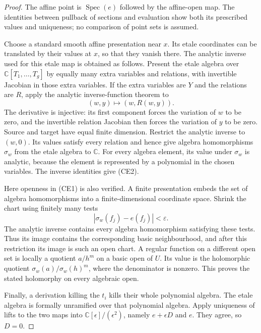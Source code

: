 \begin{proof}
The affine point is \(\operatorname{Spec}(e)\) followed by the affine-open
map.  The identities between pullback of sections and evaluation show both
its prescribed values and uniqueness; no comparison of point sets is
assumed.

Choose a standard smooth affine presentation near \(x\).  Its etale
coordinates can be translated by their values at \(x\), so that they
vanish there.  The analytic inverse used for this etale map is obtained
as follows.  Present the etale algebra over
\(\mathbb C[T_1,\ldots,T_g]\) by equally many extra variables and
relations, with invertible Jacobian in those extra variables.  If the
extra variables are \(Y\) and the relations are \(R\), apply the analytic
inverse-function theorem to
\[
             (w,y)\longmapsto (w,R(w,y)).
\]
The derivative is injective: its first component forces the variation
of \(w\) to be zero, and the invertible relation Jacobian then forces the
variation of \(y\) to be zero.  Source and target have equal finite
dimension.  Restrict the analytic inverse to \((w,0)\).
Its values satisfy every relation and hence give algebra homomorphisms
\(\sigma_w\) from the etale algebra to \(\mathbb C\).
For every algebra element, its value under \(\sigma_w\) is analytic,
because the element is represented by a polynomial in the chosen
variables.  The inverse identities give (CE2).

Here openness in (CE1) is also verified.  A finite presentation embeds
the set of algebra homomorphisms into a finite-dimensional coordinate
space.  Shrink the chart using finitely many tests
\[
       |\sigma_w(f_j)-e(f_j)|<\varepsilon .
\]
The analytic inverse contains every algebra homomorphism satisfying
these tests.  Thus its image contains the corresponding basic
neighbourhood, and after this restriction its image is such an open
chart.  A regular function on a different open set is locally a
quotient \(a/h^m\) on a basic open of \(U\).  Its value is the holomorphic
quotient \(\sigma_w(a)/\sigma_w(h)^m\), where the denominator is
nonzero.  This proves the stated holomorphy on every algebraic open.

Finally, a derivation killing the \(t_i\) kills their whole polynomial
algebra.  The etale algebra is formally unramified over that polynomial
algebra.  Apply uniqueness of lifts to the two maps into
\(\mathbb C[\epsilon]/(\epsilon^2)\), namely \(e+\epsilon D\) and \(e\).
They agree, so \(D=0\).
\end{proof}

